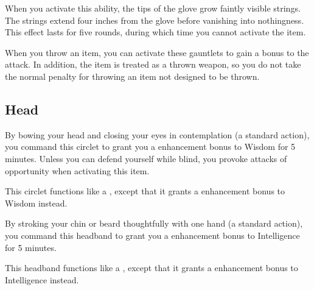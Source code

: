 When you activate this ability, the tips of the glove grow faintly visible strings. The strings extend four inches from the glove before vanishing into nothingness. This effect lasts for five rounds, during which time you cannot activate the item.


 When you throw an item, you can activate these gauntlets to gain a  bonus to the attack. In addition, the item is treated as a thrown weapon, so you do not take the normal  penalty for throwing an item not designed to be thrown.


\subsection{Head}

 By bowing your head and closing your eyes in contemplation (a standard action), you command this circlet to grant you a  enhancement bonus to Wisdom for 5 minutes. Unless you can defend yourself while blind, you provoke attacks of opportunity when activating this item.


 This circlet functions like a , except that it grants a  enhancement bonus to Wisdom instead.


 By stroking your chin or beard thoughtfully with one hand (a standard action), you command this headband to grant you a  enhancement bonus to Intelligence for 5 minutes.


 This headband functions like a , except that it grants a  enhancement bonus to Intelligence instead.

